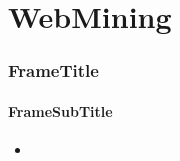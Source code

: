 \section{WebMining}

	\begin{frame}
	 	\frametitle{FrameTitle}
		\framesubtitle{FrameSubTitle}
		\begin{itemize}
		 	\item 
		\end{itemize}
	\end{frame}